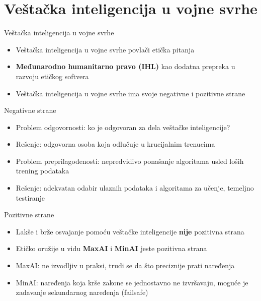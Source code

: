 \documentclass[14pt, aspectratio=169]{beamer}
\begin{document}

\section{Veštačka inteligencija u vojne svrhe}

\begin{frame}{Veštačka inteligencija u vojne svrhe}
    \begin{itemize}
    
        \item Veštačka inteligencija u vojne svrhe povlači etička pitanja
        \item \textbf{Međunarodno humanitarno pravo (IHL)} kao dodatna prepreka u razvoju etičkog softvera
        \item Veštačka inteligencija u vojne svrhe ima svoje negativne i pozitivne strane
        
    \end{itemize}
\end{frame}

\begin{frame}{Negativne strane}
    \begin{itemize}
        \item Problem odgovornosti: ko je odgovoran za dela veštačke inteligencije?
        \item Rešenje: odgovorna osoba koja odlučuje u krucijalnim trenucima
        \item Problem preprilagođenosti: nepredvidivo ponašanje algoritama usled loših trening podataka
        \item Rešenje: adekvatan odabir ulaznih podataka i algoritama za učenje, temeljno testiranje
    \end{itemize}
\end{frame}

\begin{frame}{Pozitivne strane}
    \begin{itemize}
        \item Lakše i brže osvajanje pomoću veštačke inteligencije \textbf{nije} pozitivna strana
        \item Etičko oružije u vidu \textbf{MaxAI} i \textbf{MinAI} jeste pozitivna strana
        \item MaxAI: ne izvodljiv u praksi, trudi se da što preciznije prati naređenja
        \item MinAI: naređenja koja krše zakone se jednostavno ne izvršavaju, moguće je zadavanje sekundarnog naređenja (failsafe)
    \end{itemize}    
\end{frame}
\end{document}
